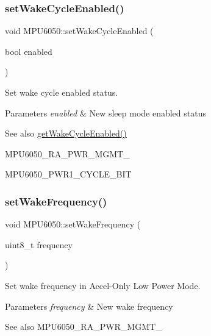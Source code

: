 \subsubsection{\texorpdfstring{setWakeCycleEnabled()}{setWakeCycleEnabled()}}
{\footnotesize\ttfamily void M\+P\+U6050\+::set\+Wake\+Cycle\+Enabled (\begin{DoxyParamCaption}\item[{bool}]{enabled }\end{DoxyParamCaption})}

Set wake cycle enabled status. 
\begin{DoxyParams}{Parameters}
{\em enabled} & New sleep mode enabled status \\
\hline
\end{DoxyParams}
\begin{DoxySeeAlso}{See also}
\mbox{\hyperlink{class_m_p_u6050_a89afc5235b9088c696e2cc7841f5259a}{get\+Wake\+Cycle\+Enabled()}} 

M\+P\+U6050\+\_\+\+R\+A\+\_\+\+P\+W\+R\+\_\+\+M\+G\+M\+T\+\_ 

M\+P\+U6050\+\_\+\+P\+W\+R1\+\_\+\+C\+Y\+C\+L\+E\+\_\+\+B\+IT 
\end{DoxySeeAlso}
\mbox{\label{class_m_p_u6050_a62495e89f4787e6b18f0f795cef2b7cd}} 
\subsubsection{\texorpdfstring{setWakeFrequency()}{setWakeFrequency()}}
{\footnotesize\ttfamily void M\+P\+U6050\+::set\+Wake\+Frequency (\begin{DoxyParamCaption}\item[{uint8\+\_\+t}]{frequency }\end{DoxyParamCaption})}

Set wake frequency in Accel-\/\+Only Low Power Mode. 
\begin{DoxyParams}{Parameters}
{\em frequency} & New wake frequency \\
\hline
\end{DoxyParams}
\begin{DoxySeeAlso}{See also}
M\+P\+U6050\+\_\+\+R\+A\+\_\+\+P\+W\+R\+\_\+\+M\+G\+M\+T\+\_ 
\end{DoxySeeAlso}
\mbox{\label{class_m_p_u6050_a53a03d1f255a62f01375c870cdc85767}} 
